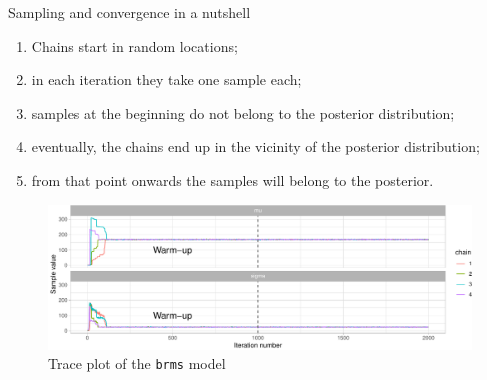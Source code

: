 \documentclass[12pt,ignorenonframetext,aspectratio=169]{beamer}
\providecommand{\tightlist}{%
  \setlength{\itemsep}{0pt}\setlength{\parskip}{0pt}}
\begin{document}
\begin{frame}[fragile]{Sampling and convergence in a nutshell}
\protect\hypertarget{sampling-and-convergence-in-a-nutshell}{}

\scriptsize

\begin{enumerate}
\tightlist
\item
  Chains start in random locations;
\item
  in each iteration they take one sample each;
\item
  samples at the beginning do not belong to the posterior distribution;
\item
  eventually, the chains end up in the vicinity of the posterior distribution;
\item
  from that point onwards the samples will belong to the posterior.
\end{enumerate}



\small

\begin{figure}
\centering
\includegraphics{03-compbayes-slides_files/figure-beamer/warmup-1.pdf}
\caption{\label{fig:warmup}Trace plot of the \texttt{brms} model}
\end{figure}

\normalsize

\end{frame}
\end{document}
